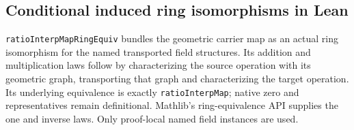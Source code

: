 \documentclass[11pt,oneside]{article}
\theoremstyle{definition}
\theoremstyle{remark}
\newcommand{\lean}[1]{\nolinkurl{#1}}
\begin{document}
\subsection{Conditional induced ring isomorphisms in Lean}

\lean{ratioInterpMapRingEquiv} bundles the geometric carrier map as an actual ring
isomorphism for the named transported field structures. Its addition and multiplication
laws follow by characterizing the source operation with its geometric graph, transporting
that graph and characterizing the target operation. Its underlying equivalence is exactly
\lean{ratioInterpMap}; native zero and representatives remain definitional. Mathlib's
ring-equivalence API supplies the one and inverse laws. Only proof-local named field
instances are used.

\end{document}
